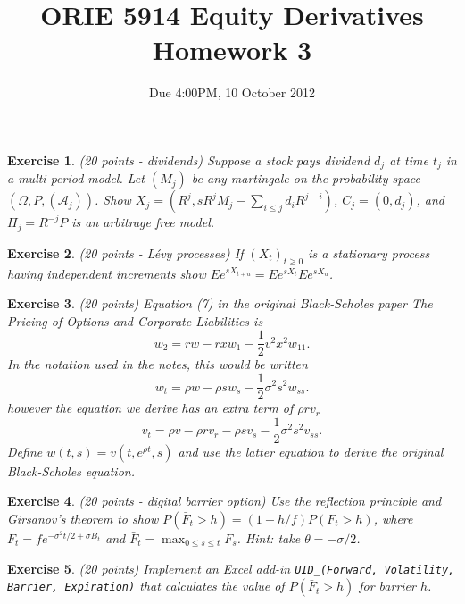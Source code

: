 \documentclass[11pt,fleqn]{amsproc}
\renewcommand{\AA}{{\mathcal A}}
\newtheorem{xca}{Exercise}
\begin{document}
\title{ORIE 5914 Equity Derivatives Homework 3}
\author{Due 4:00PM, 10 October 2012}

\maketitle

\begin{xca}{(20 points - dividends)}
Suppose a stock pays dividend \(d_j\) at time \(t_j\) in a multi-period model.
Let \((M_j)\) be any martingale on the probability space \((\Omega, P, (\AA_j))\). Show
\(X_j = (R^j, sR^jM_j - \sum_{i \le j} d_iR^{j - i})\), \(C_j = (0, d_j)\), and
\(\Pi_j = R^{-j}P\) is an arbitrage free model.
\end{xca}

\begin{xca}{(20 points - L\'evy processes)}
If \((X_t)_{t\ge0}\) is a stationary process having independent increments
show \(Ee^{sX_{t + u}} = Ee^{sX_t} Ee^{sX_u}\).
\end{xca}

\begin{xca}{(20 points)}
Equation (7) in the original Black-Scholes paper \em{The Pricing of Options and Corporate Liabilities} is 
\[w_2 = r w - rxw_1 - \frac{1}{2}v^2x^2 w_{11}.\]
In the notation used in the notes, this would be written 
\[w_t = \rho w - \rho s w_s - \frac{1}{2}\sigma^2s^2 w_{ss}.\]
however the equation we derive has an extra term of \(\rho r v_r\)
\[v_t = \rho v - \rho rv_r -\rho s v_s - \frac{1}{2}\sigma^2s^2 v_{ss}.\]
Define \(w(t, s) = v(t, e^{\rho t}, s)\) and use the latter equation to
derive the original Black-Scholes equation.
\end{xca}

\begin{xca}{(20 points - digital barrier option)}
Use the reflection principle and Girsanov's theorem to show
\(P(\bar{F}_t > h) = (1 + h/f)P(F_t > h)\), where \(F_t = fe^{-\sigma^2t/2 + \sigma B_t}\)
and \(\bar{F}_t = \max_{0\le s\le t} F_s\). {\rm Hint: take \(\theta = -\sigma/2\).}
\end{xca}

\begin{xca}{(20 points)}
Implement an Excel add-in {\tt UID\_(Forward, Volatility, Barrier, Expiration)} that
calculates the value of \(P(\bar{F}_t > h)\) for barrier \(h\).
\end{xca}
\end{document}
